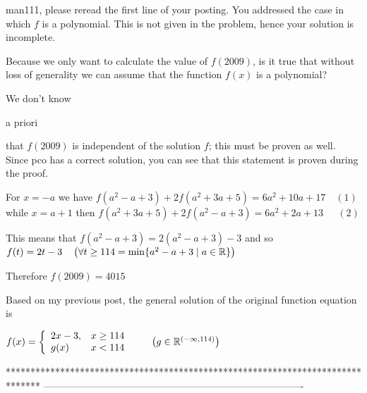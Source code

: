 \begin{solution}
	man111, please reread the first line of your posting.
You addressed the case in which $f$ is a polynomial. This is not given in the problem, hence your solution is incomplete.
\end{solution}



\begin{solution}
	Because we only want to calculate the value of $f(2009)$, is it true that without loss of generality we can assume that the function $f(x)$ is a polynomial?
\end{solution}



\begin{solution}
	We don't know \begin{italicized}a priori\end{italicized} that $f(2009)$ is independent of the solution $f$; this must be proven as well. Since pco has a correct solution, you can see that this statement is proven during the proof.
\end{solution}



\begin{solution}
	For $x = -a$ we have $f(a^2-a+3)+2f(a^2+3a+5)=6a^2+10a+17\quad(1)$ 
while $x=a+1$ then $f(a^2+3a+5)+2f(a^2-a+3)=6a^2+2a+13\;\,\quad(2)$

This means that $f(a^2-a+3) = 2(a^2-a+3)-3$ and so 
$f(t) = 2t-3\quad \left(\forall t \ge 11\/4 = \min\{a^2-a+3 \mid a\in\mathbb{R}\}\right)$

Therefore $f(2009) = 4015$
\end{solution}



\begin{solution}
	Based on my previous post, the general solution of the original function equation is

$f(x) =\left\{\begin{array}{ll} 2x-3,  &  x \ge 11\/4\\
g(x)  &  x < 11\/4 \end{array}
\right.\quad\quad \left(g\in \mathbb{R}^{(-\infty,11\/4)}\right)$
\end{solution}
*******************************************************************************
-------------------------------------------------------------------------------

